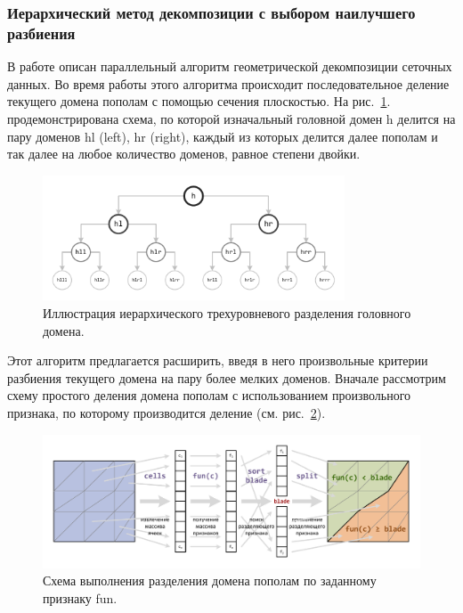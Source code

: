 \subsubsection{Иерархический метод декомпозиции с выбором наилучшего разбиения}

В работе \cite{Golovchenko2020Decomp} описан параллельный алгоритм геометрической декомпозиции сеточных данных.
Во время работы этого алгоритма происходит последовательное деление текущего домена пополам с помощью сечения плоскостью.
На рис.~\ref{fig:text_2_decompsurf_hierarchical}. продемонстрирована схема, по которой изначальный головной домен h делится на пару доменов hl (left), hr (right), каждый из которых делится далее пополам и так далее на любое количество доменов, равное степени двойки.

\begin{figure}[h]
	\centering
	\includegraphics[width=0.8\textwidth]{./pics/text_2_decompsurf/hierarchical.pdf}
	\caption{Иллюстрация иерархического трехуровневого разделения головного домена.}
	\label{fig:text_2_decompsurf_hierarchical}
\end{figure}

Этот алгоритм предлагается расширить, введя в него произвольные критерии разбиения текущего домена на пару более мелких доменов.
Вначале рассмотрим схему простого деления домена пополам с использованием произвольного признака, по которому производится деление (см. рис.~\ref{fig:text_2_decompsurf_split}).

\begin{figure}[h]
	\centering
	\includegraphics[width=1.0\textwidth]{./pics/text_2_decompsurf/split.pdf}
	\caption{Схема выполнения разделения домена пополам по заданному признаку fun.}
	\label{fig:text_2_decompsurf_split}
\end{figure}

